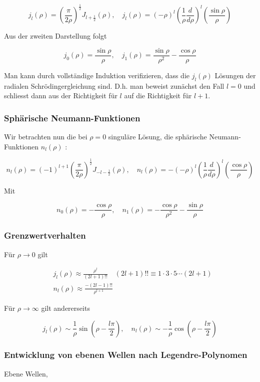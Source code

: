 \documentclass[10pt, letterpaper]{article}
\begin{document}
$$
j_{l}(\rho)=\left(\frac{\pi}{2 \rho}\right)^{\frac{1}{2}} J_{l+\frac{1}{2}}(\rho), \quad j_{l}(\rho)=(-\rho)^{l}\left(\frac{1}{\rho} \frac{d}{d \rho}\right)^{l}\left(\frac{\sin \rho}{\rho}\right)
$$

Aus der zweiten Darstellung folgt

$$
j_{0}(\rho)=\frac{\sin \rho}{\rho}, \quad j_{1}(\rho)=\frac{\sin \rho}{\rho^{2}}-\frac{\cos \rho}{\rho}
$$

Man kann durch vollständige Induktion verifizieren, dass die $j_{l}(\rho)$ Lösungen der radialen Schrödingergleichung sind. D.h. man beweist zunächst den Fall $l=0$ und schliesst dann aus der Richtigkeit für $l$ auf die Richtigkeit für $l+1$.

\subsubsection*{Sphärische Neumann-Funktionen}
Wir betrachten nun die bei $\rho=0$ singuläre Lösung, die sphärische Neumann-Funktionen $n_{l}(\rho)$ :

$$
n_{l}(\rho)=(-1)^{l+1}\left(\frac{\pi}{2 \rho}\right)^{\frac{1}{2}} J_{-l-\frac{1}{2}}(\rho), \quad n_{l}(\rho)=-(-\rho)^{l}\left(\frac{1}{\rho} \frac{d}{d \rho}\right)^{l}\left(\frac{\cos \rho}{\rho}\right)
$$

Mit

$$
n_{0}(\rho)=-\frac{\cos \rho}{\rho}, \quad n_{1}(\rho)=-\frac{\cos \rho}{\rho^{2}}-\frac{\sin \rho}{\rho}
$$

\subsubsection*{Grenzwertverhalten}
Für $\rho \rightarrow 0$ gilt

$$
\begin{aligned}
& j_{l}(\rho) \approx \frac{\rho^{l}}{(2 l+1)!!} \quad(2 l+1)!!\equiv 1 \cdot 3 \cdot 5 \cdots(2 l+1) \\
& n_{l}(\rho) \approx \frac{-(2 l-1)!!}{\rho^{l+1}}
\end{aligned}
$$

Für $\rho \rightarrow \infty$ gilt andererseits

$$
j_{l}(\rho) \sim \frac{1}{\rho} \sin \left(\rho-\frac{l \pi}{2}\right), \quad n_{l}(\rho) \sim-\frac{1}{\rho} \cos \left(\rho-\frac{l \pi}{2}\right)
$$

\subsubsection*{Entwicklung von ebenen Wellen nach Legendre-Polynomen}
Ebene Wellen,
\end{document}
